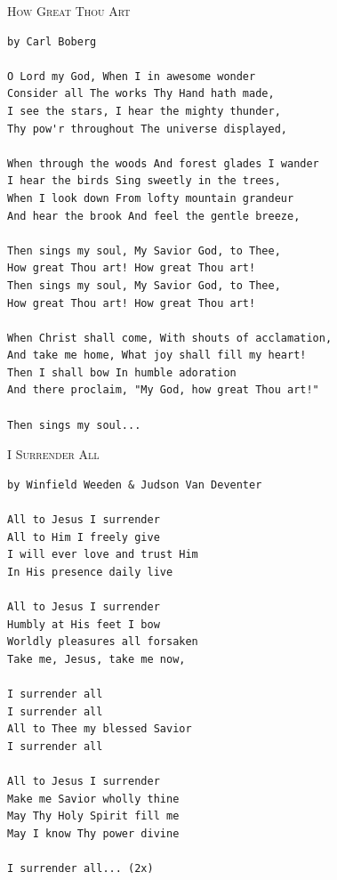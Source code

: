 \documentclass[10pt,oneside,footinclude=true,headinclude=true]{scrbook} %
\newcommand\songtitle[1]{
	\hspace*{-3.7mm}\Large\textsc{#1}
}
\begin{document}
\bigskip
\medskip
\songtitle{How Great Thou Art}
\begin{verbatim}
by Carl Boberg

O Lord my God, When I in awesome wonder
Consider all The works Thy Hand hath made,
I see the stars, I hear the mighty thunder,
Thy pow'r throughout The universe displayed,

When through the woods And forest glades I wander
I hear the birds Sing sweetly in the trees,
When I look down From lofty mountain grandeur
And hear the brook And feel the gentle breeze,

Then sings my soul, My Savior God, to Thee,
How great Thou art! How great Thou art!
Then sings my soul, My Savior God, to Thee,
How great Thou art! How great Thou art!

When Christ shall come, With shouts of acclamation,
And take me home, What joy shall fill my heart!
Then I shall bow In humble adoration
And there proclaim, "My God, how great Thou art!"

Then sings my soul...
\end{verbatim}


\bigskip
\medskip
\songtitle{I Surrender All}
\begin{verbatim}
by Winfield Weeden & Judson Van Deventer

All to Jesus I surrender
All to Him I freely give
I will ever love and trust Him
In His presence daily live

All to Jesus I surrender
Humbly at His feet I bow
Worldly pleasures all forsaken
Take me, Jesus, take me now,

I surrender all
I surrender all
All to Thee my blessed Savior
I surrender all

All to Jesus I surrender
Make me Savior wholly thine
May Thy Holy Spirit fill me
May I know Thy power divine

I surrender all... (2x)
\end{verbatim}

\end{document}
